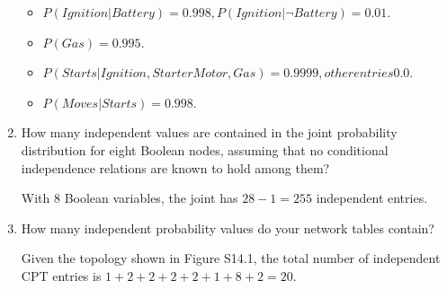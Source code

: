 \documentclass[9pt,a4paper]{extarticle}
\newenvironment{solution}
    {%
    \color{red}
    }
    { 
    \color{black}
    }
\begin{document}
\begin{enumerate}
\begin{solution}
\begin{itemize}
        \item   $P (Ignition|Battery) = 0.998, P (Ignition|\lnot Battery) = 0.01$.
        \item   $P (Gas) = 0.995$.
        \item   $P(Starts|Ignition,StarterMotor,Gas) = 0.9999, other entries 0.0$.
        \item   $P(Moves|Starts) = 0.998$.
    \end{itemize}
    \end{solution}
    \item How many independent values are contained in the joint probability distribution for eight Boolean nodes, assuming that no conditional independence relations are known to hold among them?
    \begin{solution}
    With 8 Boolean variables, the joint has $28 - 1 = 255$ independent entries.
    \end{solution}
    
    \item How many independent probability values do your network tables contain?
    \begin{solution}
    Given the topology shown in Figure S14.1, the total number of independent CPT entries is $1+2+2+2+2+1+8+2= 20$.
    \end{solution}
\end{enumerate}
\end{document}
